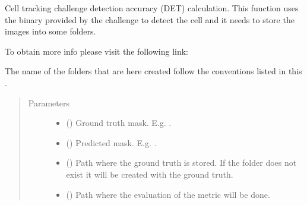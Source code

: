 \documentclass[letterpaper,10pt,english]{sphinxmanual}
\begin{document}
\begin{fulllineitems}
\label{\detokenize{engine/metrics:engine.metrics.DET_calculation}}
Cell tracking challenge detection accuracy (DET) calculation. This function uses the binary provided by the
challenge to detect the cell and it needs to store the images into some folders.

To obtain more info please visit the following link:
\begin{quote}

\end{quote}

The name of the folders that are here created follow the conventions listed
in this .
\begin{quote}\begin{description}
\item[{Parameters}] \leavevmode\begin{itemize}
\item {} 
 () \textendash{} Ground truth mask. E.g. .

\item {} 
 () \textendash{} Predicted mask. E.g. .

\item {} 
 () \textendash{} Path where the ground truth is stored. If the folder does not exist it will be created with the 
ground truth.

\item {} 
 () \textendash{} Path where the evaluation of the metric will be done.


\end{itemize}
\end{description}
\end{quote}
\end{fulllineitems}
\end{document}
